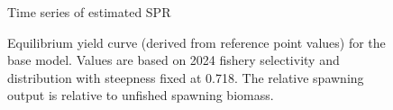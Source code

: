 \documentclass[
]{scrartcl}
\begin{document}
\begin{figure}


\caption{\label{fig-time-spr}Time series of estimated SPR}

\end{figure}%

\begin{figure}


\caption{\label{fig-eq-yield}Equilibrium yield curve (derived from
reference point values) for the base model. Values are based on 2024
fishery selectivity and distribution with steepness fixed at 0.718. The
relative spawning output is relative to unfished spawning biomass.}

\end{figure}%
\end{document}
